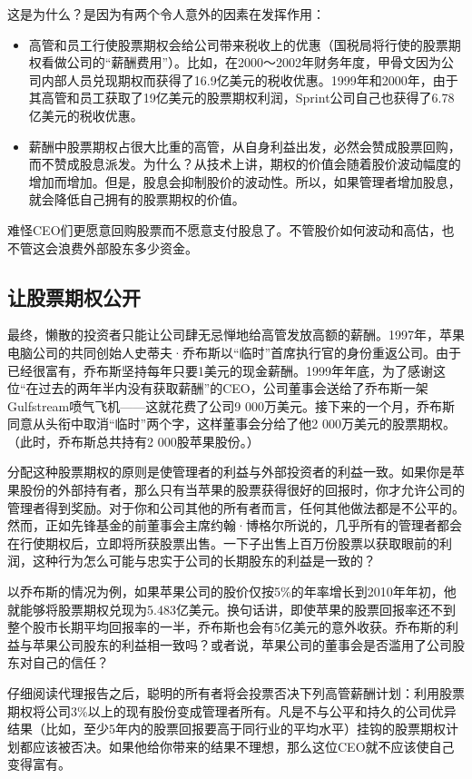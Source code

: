 \documentclass[12pt,oneside]{book}
\begin{document}
这是为什么？是因为有两个令人意外的因素在发挥作用：

\begin{itemize}
\item 高管和员工行使股票期权会给公司带来税收上的优惠（国税局将行使的股票期权看做公司的“薪酬费用”）。比如，在2000～2002年财务年度，甲骨文因为公司内部人员兑现期权而获得了16.9亿美元的税收优惠。1999年和2000年，由于其高管和员工获取了19亿美元的股票期权利润，Sprint公司自己也获得了6.78亿美元的税收优惠。
\item 薪酬中股票期权占很大比重的高管，从自身利益出发，必然会赞成股票回购，而不赞成股息派发。为什么？从技术上讲，期权的价值会随着股价波动幅度的增加而增加。但是，股息会抑制股价的波动性。所以，如果管理者增加股息，就会降低自己拥有的股票期权的价值。
\end{itemize}

难怪CEO们更愿意回购股票而不愿意支付股息了。不管股价如何波动和高估，也不管这会浪费外部股东多少资金。

\subsection{让股票期权公开}
最终，懒散的投资者只能让公司肆无忌惮地给高管发放高额的薪酬。1997年，苹果电脑公司的共同创始人史蒂夫·乔布斯以“临时”首席执行官的身份重返公司。由于已经很富有，乔布斯坚持每年只要1美元的现金薪酬。1999年年底，为了感谢这位“在过去的两年半内没有获取薪酬”的CEO，公司董事会送给了乔布斯一架Gulfstream喷气飞机——这就花费了公司9 000万美元。接下来的一个月，乔布斯同意从头衔中取消“临时”两个字，这样董事会分给了他2 000万美元的股票期权。（此时，乔布斯总共持有2 000股苹果股份。）

分配这种股票期权的原则是使管理者的利益与外部投资者的利益一致。如果你是苹果股份的外部持有者，那么只有当苹果的股票获得很好的回报时，你才允许公司的管理者得到奖励。对于你和公司其他的所有者而言，任何其他做法都是不公平的。然而，正如先锋基金的前董事会主席约翰·博格尔所说的，几乎所有的管理者都会在行使期权后，立即将所获股票出售。一下子出售上百万份股票以获取眼前的利润，这种行为怎么可能与忠实于公司的长期股东的利益是一致的？

以乔布斯的情况为例，如果苹果公司的股价仅按5\%的年率增长到2010年年初，他就能够将股票期权兑现为5.483亿美元。换句话讲，即使苹果的股票回报率还不到整个股市长期平均回报率的一半，乔布斯也会有5亿美元的意外收获。乔布斯的利益与苹果公司股东的利益相一致吗？或者说，苹果公司的董事会是否滥用了公司股东对自己的信任？

仔细阅读代理报告之后，聪明的所有者将会投票否决下列高管薪酬计划：利用股票期权将公司3\%以上的现有股份变成管理者所有。凡是不与公平和持久的公司优异结果（比如，至少5年内的股票回报要高于同行业的平均水平）挂钩的股票期权计划都应该被否决。如果他给你带来的结果不理想，那么这位CEO就不应该使自己变得富有。
\end{document}

